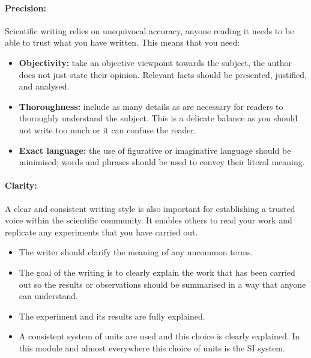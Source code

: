 \documentclass[a4paper,12pt]{book}
\begin{document}
\paragraph{Precision:} Scientific writing relies on unequivocal accuracy, anyone reading it needs to be able to trust what you have written. This means that you need:
\begin{itemize}
\setlength{\itemsep}{-5pt}
    \item \textbf{Objectivity:} take an objective viewpoint towards the subject, the author does not just state their opinion. Relevant facts should be presented, justified, and analysed.
    \item \textbf{Thoroughness:} include as many details as are necessary for readers to thoroughly understand the subject. This is a delicate balance as you should not write too much or it can confuse the reader.
    \item \textbf{Exact language:} the use of figurative or imaginative language should be minimised; words and phrases should be used to convey their literal meaning.
\end{itemize}

\paragraph{Clarity:}A clear and consistent writing style is also important for establishing a trusted voice within the scientific community. It enables others to read your work and replicate any experiments that you have carried out.
\begin{itemize}
\setlength{\itemsep}{-5pt}
    \item The writer should clarify the meaning of any uncommon terms.
    \item The goal of the writing is to clearly explain the work that has been carried out so the results or observations should be summarised in a way that anyone can understand.
    \item The experiment and its results are fully explained.
    \item A consistent system of units are used and this choice is clearly explained. In this module and almost everywhere this choice of units is the SI system.
\end{itemize}
\end{document}
